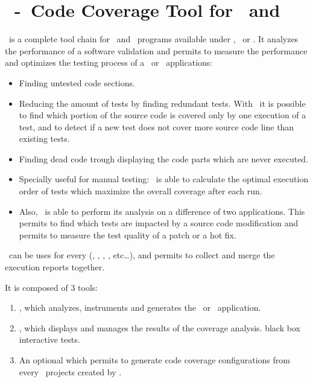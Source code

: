 \section{\TestCocoon~-~Code Coverage Tool for \CorCPlusPlus\ and \CSharp}
\TestCocoon\ is a complete  tool chain for \CorCPlusPlus\ and \CSharp\ programs available under \MacOSX, \Linux\  or \MicrosoftWindows. 
It analyzes the performance of a software validation 
and permits to measure the performance and optimizes the testing process of a \CorCPlusPlus\ or \CSharp\ applications:

\begin{itemize}
  \item Finding untested code sections.
  \item Reducing the amount of tests by finding redundant tests. \newline
        With \TestCocoon\ it is possible to find which portion 
        of the source code is covered only by one execution of a test, and
        to detect if a new test does not cover more source code line than existing tests.
  \item Finding dead code trough displaying the 
        code parts which are never executed.
  \item Specially useful for manual testing: \newline 
        \TestCocoon\ is able to calculate
        the optimal execution order of  tests which maximize  the overall coverage after each run.
  \item Also, \TestCocoon\ is able to perform its analysis on a difference of two applications.\newline
        This permits to find which tests are impacted by a source code modification and permits to measure the test quality of a patch or a hot fix.
\end{itemize}

\TestCocoon\ can be uses for every
(,
 ,
 ,
 , etc\ldots),
  and permits to collect and merge the execution reports together.

It is composed of 3 tools:
\begin{enumerate}
 \item {}, which analyzes, instruments and generates the \CorCPlusPlus\ or \CSharp\ application.
 \item {}, which displays and manages the results of the coverage analysis.
       black box interactive tests.
 \item An optional  which permits to generate code coverage configurations from every \CorCPlusPlus\ projects created by \VisualStudio.
\end{enumerate}

